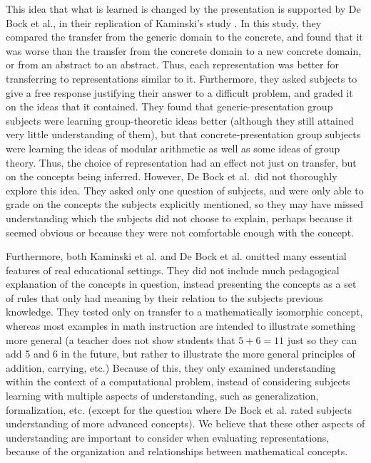 \documentclass[man,10pt]{apa6}
\begin{document}
This idea that what is learned is changed by the presentation is supported by De Bock et al., in their replication of Kaminski's study \cite{DeBock2011}. In this study, they compared the transfer from the generic domain to the concrete, and found that it was worse than the transfer from the concrete domain to a new concrete domain, or from an abstract to an abstract. Thus, each representation was better for transferring to representations similar to it. Furthermore, they asked subjects to give a free response justifying their answer to a difficult problem, and graded it on the ideas that it contained. They found that generic-presentation group subjects were learning group-theoretic ideas better (although they still attained very little understanding of them), but that concrete-presentation group subjects were learning the ideas of modular arithmetic as well as some ideas of group theory. Thus, the choice of representation had an effect not just on transfer, but on the concepts being inferred. However, De Bock et al.\ did not thoroughly explore this idea. They asked only one question of subjects, and were only able to grade on the concepts the subjects explicitly mentioned, so they may have missed understanding which the subjects did not choose to explain, perhaps because it seemed obvious or because they were not comfortable enough with the concept.\par
Furthermore, both Kaminski et al. and De Bock et al. omitted many essential features of real educational settings. They did not include much pedagogical explanation of the concepts in question, instead presenting the concepts as a set of rules that only had meaning by their relation to the subjects previous knowledge. They tested only on transfer to a mathematically isomorphic concept, whereas most examples in math instruction are intended to illustrate something more general (a teacher does not show students that $5+6 = 11$ just so they can add 5 and 6 in the future, but rather to illustrate the more general principles of addition, carrying, etc.) Because of this, they only examined understanding within the context of a computational problem, instead of considering subjects learning with multiple aspects of understanding, such as generalization, formalization, etc. (except for the question where De Bock et al. rated subjects understanding of more advanced concepts). We believe that these other aspects of understanding are important to consider when evaluating representations, because of the organization and relationships between mathematical concepts.
\end{document}

